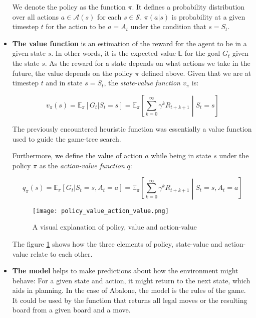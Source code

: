 \begin{itemize}
          We denote the policy as the function $\pi $. It defines a probability distribution over all actions $ a \in \mathcal{A}(s)$ for each $ s \in \mathcal{S} $. $ \pi(a|s)$ is probability at a given timestep $t$ for the action to be $ a = A_t $ under the condition that $ s = S_t $.

    \item \textbf{The value function} is an estimation of the reward for the agent to be in a given state $ s $. In other words, it is the expected value $\mathbb{E}$  for the goal $G_t$ given the state $s$. As the reward for a state depends on what actions we take in the future, the value depends on the policy $ \pi $ defined above. Given that we are at timestep $ t $ and in state $ s = S_t $, the \textit{state-value function $v_{\pi}$} is:

          \begin{equation}
              v_{\pi}(s) = \mathbb{E}_{\pi}[G_t | S_t = s] = \mathbb{E}_{\pi}\left[\sum_{k=0}^{\infty} \gamma^kR_{t+k+1} \middle| S_t = s \right]
          \end{equation}

          The previously encountered heuristic function was essentially a value function used to guide the game-tree search.

          Furthermore, we define the value of action $a$ while being in state $s$ under the policy $\pi$ as the \textit{action-value function} $q$:

          \begin{equation}
              q_{\pi}(s) = \mathbb{E}_{\pi}[G_t | S_t = s, A_t = a] = \mathbb{E}_{\pi}\left[\sum_{k=0}^{\infty} \gamma^kR_{t+k+1} \middle| S_t = s, A_t = a \right]
          \end{equation}

          \begin{figure}
              \centering
              \texttt{[image: policy\_value\_action\_value.png]}
              \caption{A visual explanation of policy, value and action-value \cite[p. 62]{sutton_reinforcement_2018}}
              \label{policy_value_action_value}
          \end{figure}

          The figure \ref{policy_value_action_value} shows how the three elements of policy, state-value and action-value relate to each other.

    \item \textbf{The model} helps to make predictions about how the environment might behave: For a given state and action, it might return to the next state, which aids in planning. In the case of Abalone, the model is the rules of the game. It could be used by the function that returns all legal moves or the resulting board from a given board and a move.
\end{itemize}

